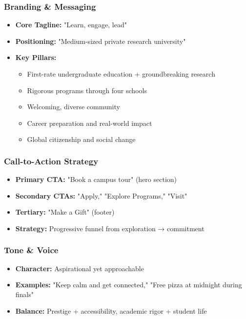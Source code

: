 \documentclass[12pt,letterpaper]{article}
\begin{document}
\subsubsection{Branding \& Messaging}
\begin{itemize}[leftmargin=*]
    \item \textbf{Core Tagline:} "Learn, engage, lead"
    \item \textbf{Positioning:} "Medium-sized private research university"
    \item \textbf{Key Pillars:}
    \begin{itemize}
        \item First-rate undergraduate education + groundbreaking research
        \item Rigorous programs through four schools
        \item Welcoming, diverse community
        \item Career preparation and real-world impact
        \item Global citizenship and social change
    \end{itemize}
\end{itemize}

\subsubsection{Call-to-Action Strategy}
\begin{itemize}[leftmargin=*]
    \item \textbf{Primary CTA:} "Book a campus tour" (hero section)
    \item \textbf{Secondary CTAs:} "Apply," "Explore Programs," "Visit"
    \item \textbf{Tertiary:} "Make a Gift" (footer)
    \item \textbf{Strategy:} Progressive funnel from exploration → commitment
\end{itemize}

\subsubsection{Tone \& Voice}
\begin{itemize}[leftmargin=*]
    \item \textbf{Character:} Aspirational yet approachable
    \item \textbf{Examples:} "Keep calm and get connected," "Free pizza at midnight during finals"
    \item \textbf{Balance:} Prestige + accessibility, academic rigor + student life
\end{itemize}
\end{document}
